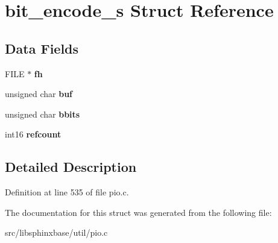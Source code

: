 \section{bit\-\_\-encode\-\_\-s Struct Reference}
\label{structbit__encode__s}
\subsection*{Data Fields}
\begin{DoxyCompactItemize}
\item 
F\-I\-L\-E $\ast$ {\bfseries fh}\label{structbit__encode__s_af0c1de2333ec798aa832e762f4ee9887}

\item 
unsigned char {\bfseries buf}\label{structbit__encode__s_af068f9ee3624aed0b0c8720d579d2c7b}

\item 
unsigned char {\bfseries bbits}\label{structbit__encode__s_a69d53d4800481f63b0c2b990472323f8}

\item 
int16 {\bfseries refcount}\label{structbit__encode__s_af2862417e58a196618593631fc5e9833}

\end{DoxyCompactItemize}


\subsection{Detailed Description}


Definition at line 535 of file pio.\-c.



The documentation for this struct was generated from the following file\-:\begin{DoxyCompactItemize}
\item 
src/libsphinxbase/util/pio.\-c\end{DoxyCompactItemize}

